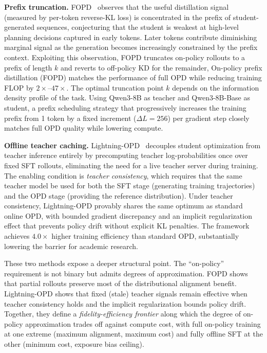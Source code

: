 \documentclass{article} %
\begin{document}
\textbf{Prefix truncation.} FOPD~\citep{2602.15260} observes that the useful distillation signal (measured by per-token reverse-KL loss) is concentrated in the prefix of student-generated sequences, conjecturing that the student is weakest at high-level planning decisions captured in early tokens. Later tokens contribute diminishing marginal signal as the generation becomes increasingly constrained by the prefix context. Exploiting this observation, FOPD truncates on-policy rollouts to a prefix of length $k$ and reverts to off-policy KD for the remainder, On-policy prefix distillation (FOPD) matches the performance of full OPD while reducing training FLOP by $2\times$--$47\times$. The optimal truncation point $k$ depends on the information density profile of the task. Using Qwen3-8B as teacher and Qwen3-8B-Base as student, a prefix scheduling strategy that progressively increases the training prefix from 1 token by a fixed increment ($\Delta L = 256$) per gradient step closely matches full OPD quality while lowering compute.

\textbf{Offline teacher caching.} Lightning-OPD~\citep{2604.13010} decouples student optimization from teacher inference entirely by precomputing teacher log-probabilities once over fixed SFT rollouts, eliminating the need for a live teacher server during training. The enabling condition is \emph{teacher consistency}, which requires that the same teacher model be used for both the SFT stage (generating training trajectories) and the OPD stage (providing the reference distribution). Under teacher consistency, Lightning-OPD provably shares the same optimum as standard online OPD, with bounded gradient discrepancy and an implicit regularization effect that prevents policy drift without explicit KL penalties. The framework achieves $4.0\times$ higher training efficiency than standard OPD, substantially lowering the barrier for academic research.

These two methods expose a deeper structural point. The ``on-policy'' requirement is not binary but admits degrees of approximation. FOPD shows that partial rollouts preserve most of the distributional alignment benefit. Lightning-OPD shows that fixed (stale) teacher signals remain effective when teacher consistency holds and the implicit regularization bounds policy drift. Together, they define a \emph{fidelity-efficiency frontier} along which the degree of on-policy approximation trades off against compute cost, with full on-policy training at one extreme (maximum alignment, maximum cost) and fully offline SFT at the other (minimum cost, exposure bias ceiling).
\end{document}
